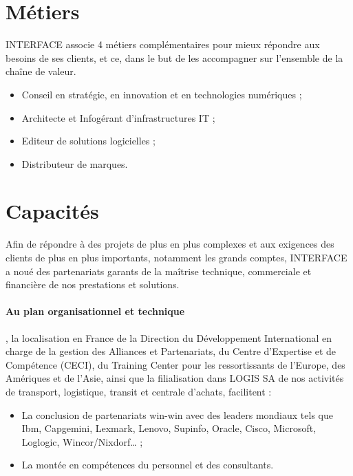 \section{Métiers}
INTERFACE associe 4 métiers complémentaires pour mieux répondre aux besoins de ses clients, et ce, dans le but de les accompagner sur l’ensemble de la chaîne de valeur.
\begin{itemize}
    \item Conseil en stratégie, en innovation et en technologies numériques ;
    \item Architecte et Infogérant d’infrastructures IT ;
    \item Editeur de solutions logicielles ; 
    \item Distributeur de  marques. 
\end{itemize}

\section{Capacités}
Afin de répondre à des projets de plus en plus complexes et aux exigences des clients de plus en plus importants, notamment les grands comptes, INTERFACE a noué des partenariats garants de la maîtrise technique, commerciale et ﬁnancière de nos prestations et solutions. 
\paragraph{Au plan organisationnel et technique}, la localisation en France de la Direction du Développement International en charge de la gestion des Alliances et Partenariats, du Centre d’Expertise et de Compétence (CECI), du Training Center pour les ressortissants de l’Europe, des Amériques et de l’Asie, ainsi que la filialisation dans LOGIS SA de nos activités de transport, logistique, transit  et centrale d’achats, facilitent :
\begin{itemize}
    \item La conclusion de partenariats win-win avec des leaders mondiaux tels que Ibm, Capgemini, Lexmark, Lenovo, Supinfo, Oracle, Cisco, Microsoft, Loglogic, Wincor/Nixdorf… ;
    \item La montée en compétences du personnel et des consultants.
\end{itemize}

